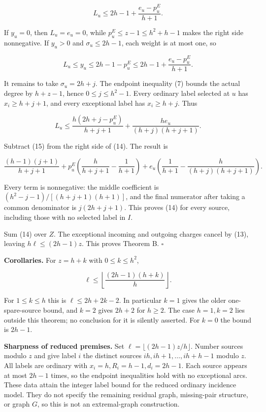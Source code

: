 \documentclass[
  11pt,
  a4paper,
]{article}
\begin{document}
\[L_u\le2h-1+\frac{e_u-p^E_u}{h+1}. \tag{14}\]

If \(y_u=0\), then \(L_u=e_u=0\), while \(p^E_u\le z-1\le h^2+h-1\)
makes the right side nonnegative. If \(y_u>0\) and \(\sigma_u\le2h-1\),
each weight is at most one, so

\[L_u\le y_u\le2h-1-p^E_u\le2h-1+\frac{e_u-p^E_u}{h+1}.\]

It remains to take \(\sigma_u=2h+j\). The endpoint inequality (7) bounds
the actual degree by \(h+z-1\), hence \(0\le j\le h^2-1\). Every
ordinary label selected at \(u\) has \(x_i\ge h+j+1\), and every
exceptional label has \(x_i\ge h+j\). Thus

\[L_u\le\frac{h(2h+j-p^E_u)}{h+j+1}+\frac{he_u}{(h+j)(h+j+1)}. \tag{15}\]

Subtract (15) from the right side of (14). The result is

\[\frac{(h-1)(j+1)}{h+j+1}+p^E_u\left(\frac h{h+j+1}-\frac1{h+1}\right)+e_u\left(\frac1{h+1}-\frac h{(h+j)(h+j+1)}\right).\]

Every term is nonnegative: the middle coefficient is
\((h^2-j-1)/[(h+j+1)(h+1)]\), and the final numerator after taking a
common denominator is \(j(2h+j+1)\). This proves (14) for every source,
including those with no selected label in \(I\).

Sum (14) over \(Z\). The exceptional incoming and outgoing charges
cancel by (13), leaving \(h\ell\le(2h-1)z\). This proves Theorem B.
\(\square\)

\textbf{Corollaries.} For \(z=h+k\) with \(0\le k\le h^2\),

\[\ell\le\left\lfloor\frac{(2h-1)(h+k)}h\right\rfloor.\]

For \(1\le k\le h\) this is \(\ell\le2h+2k-2\). In particular \(k=1\)
gives the older one-spare-source bound, and \(k=2\) gives \(2h+2\) for
\(h\ge2\). The case \(h=1,k=2\) lies outside this theorem; no conclusion
for it is silently asserted. For \(k=0\) the bound is \(2h-1\).

\textbf{Sharpness of reduced premises.} Set
\(\ell=\lfloor(2h-1)z/h\rfloor\). Number sources modulo \(z\) and give
label \(i\) the distinct sources \(ih,ih+1,\ldots,ih+h-1\) modulo \(z\).
All labels are ordinary with \(x_i=h,R_i=h-1,d_i=2h-1\). Each source
appears at most \(2h-1\) times, so the endpoint inequalities hold with
no exceptional arcs. These data attain the integer label bound for the
reduced ordinary incidence model. They do not specify the remaining
residual graph, missing-pair structure, or graph \(G\), so this is not
an extremal-graph construction.
\end{document}
